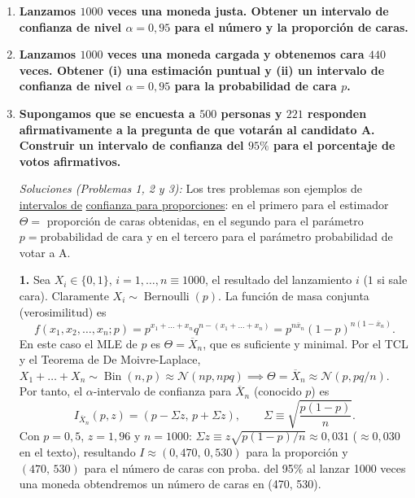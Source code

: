 \begin{enumerate}
  \item \textbf{Lanzamos $1000$ veces una moneda justa. Obtener un intervalo de confianza de nivel $\alpha = 0{,}95$ para el número y la proporción de caras.}

  \item \textbf{Lanzamos $1000$ veces una moneda cargada y obtenemos cara $440$ veces. Obtener (i) una estimación puntual y (ii) un intervalo de confianza de nivel $\alpha = 0{,}95$ para la probabilidad de cara $p$.}

  \item \textbf{Supongamos que se encuesta a $500$ personas y $221$ responden afirmativamente a la pregunta de que votarán al candidato A. Construir un intervalo de confianza del $95\%$ para el porcentaje de votos afirmativos.}

  \smallskip
  \noindent\emph{Soluciones (Problemas 1, 2 y 3):} Los tres problemas son ejemplos de \underline{intervalos de}
  \underline{confianza para proporciones}: en el primero para el estimador $\Theta =$ proporción de caras obtenidas, en el segundo para el parámetro $p = \text{probabilidad de cara}$ y en el tercero para el parámetro probabilidad de votar a A.

  \textbf{1.} Sea $X_i \in \{0,1\}$, $i = 1, \dots, n \equiv 1000$, el resultado del lanzamiento $i$ ($1$ si sale cara). Claramente $X_i \sim \operatorname{Bernoulli}(p)$. La función de masa conjunta (verosimilitud) es
  \[
    f(x_1, x_2, \dots, x_n; p) = p^{x_1 + \dots + x_n} q^{n - (x_1 + \dots + x_n)} = p^{n\overline{x}_n}(1-p)^{n(1-\overline{x}_n)}.
  \]
  En este caso el MLE de $p$ es $\Theta = \overline{X}_n$, que es suficiente y minimal. Por el TCL y el Teorema de De Moivre-Laplace, $X_1 + \dots + X_n \sim \operatorname{Bin}(n,p) \approx \mathcal{N}(np, npq) \implies \Theta = \overline{X}_n \approx \mathcal{N}(p, pq/n)$. Por tanto, el $\alpha$-intervalo de confianza para $\overline{X}_n$ (conocido $p$) es
  \[
    I_{\overline{X}_n}(p, z) = (p - \Sigma z,\, p + \Sigma z), \qquad \Sigma \equiv \sqrt{\frac{p(1-p)}{n}}.
  \]
  Con $p = 0{,}5$, $z = 1{,}96$ y $n = 1000$: $\Sigma z \equiv z\sqrt{p(1-p)/n} \approx 0{,}031$ ($\approx 0{,}030$ en el texto), resultando $I \approx (0{,}470,\, 0{,}530)$ para la proporción y $(470,\, 530)$ para el número de caras con proba. del 95\% al lanzar 1000 veces una moneda obtendremos un número de caras en (470, 530).


\end{enumerate}
